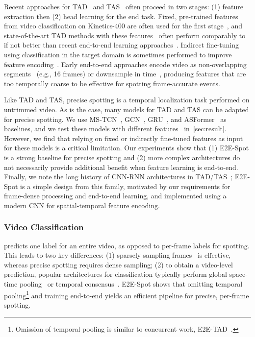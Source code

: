 \documentclass[runningheads]{llncs}
\newcommand{\OURMETHOD}{{E2E-Spot}\xspace}
\begin{document}
Recent approaches for TAD~\cite{pdan,bmn,bsn,mlad,gtad,pgcn} and TAS~\cite{hasr,sstda,mstcn,asrf,c2ftcn,asformer} often proceed in two stages: (1) feature extraction then (2) head learning for the end task.
Fixed, pre-trained features from video classification on Kinetics-400 are often used for the first stage~\cite{tsp,i3d,tsn}, and
state-of-the-art TAD methods with these features~\cite{muses,actionformer,vsgn} often perform comparably to if not better than recent end-to-end learning approaches~\cite{afsd,e2etad}.
Indirect fine-tuning using classification in the target domain is sometimes performed to improve feature encoding~\cite{tsp,charadeschallenge}.
Early end-to-end approaches encode video as non-overlapping segments~\cite{sstad} (e.g., 16 frames) or downsample in time~\cite{asynctemporalfields,multistreamfgdet}, producing features that are too temporally coarse to be effective for spotting frame-accurate events.

Like TAD and TAS, precise spotting is a temporal localization task performed on untrimmed video.
As is the case, many models for TAD and TAS can be adapted for precise spotting.
We use MS-TCN~\cite{mstcn}, GCN~\cite{gtad}, GRU~\cite{gatedrnn}, and ASFormer~\cite{asformer} as baselines, and we test these models with different  features~\cite{tsp,i3d,mvit} in~\autoref{sec:result}.
However, we find that relying on fixed or indirectly fine-tuned features as input for these models is a critical limitation.
Our experiments show that (1) \OURMETHOD is a strong baseline for precise spotting and (2) more complex architectures do not necessarily provide additional benefit when feature learning is end-to-end.
Finally, we note the long history of CNN-RNN architectures in TAD/TAS~\cite{sstad,sst,msbilstm,multithumos,tricornet};
\OURMETHOD is a simple design from this family, motivated by our requirements for frame-dense processing and end-to-end learning, and implemented using a modern CNN for spatial-temporal feature encoding.

\subsubsection*{Video Classification} predicts one label for an entire video, as opposed to per-frame labels for spotting.
This leads to two key differences: (1) sparsely sampling frames~\cite{slowfast,tsn} is effective, whereas precise spotting requires dense sampling;
(2) to obtain a video-level prediction, popular architectures for classification typically perform global space-time
pooling~\cite{r21d} or temporal consensus~\cite{tsm,tsn,trn}.
\OURMETHOD shows that omitting temporal pooling\footnote{Omission of temporal pooling is similar to concurrent work, E2E-TAD~\cite{e2etad}.} and training end-to-end yields an efficient pipeline for precise, per-frame spotting.
\end{document}
